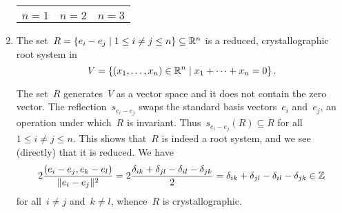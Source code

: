\begin{examples}
\begin{enumerate}
\begin{center}
\begin{tabular}{ccc}
\begin{tikzpicture}
          \end{tikzpicture}
          \\
          $n = 1$
          &
          $n = 2$
          &
          $n = 3$
        \end{tabular}
        \endgroup
      \end{center}
    \item
      The set~$R = \{ e_i - e_j \suchthat 1 \leq i \neq j \leq n\} \subseteq \Real^n$ is a reduced, crystallographic root system in
      \[
        V
        =
        \{
          (x_1, \dotsc, x_n) \in \Real^n
        \suchthat
          x_1 + \dotsb + x_n = 0
        \} \,.
      \]
      
      The set~$R$ generates~$V$ as a vector space and it does not contain the zero vector.
      The reflection~$s_{e_i - e_j}$ swaps the standard basis vectors~$e_i$ and~$e_j$, an operation under which~$R$ is invariant.
      Thus~$s_{e_i - e_j}(R) \subseteq R$ for all~$1 \leq i \neq j \leq n$.
      This shows that~$R$ is indeed a root system, and we see (directly) that it is reduced.
      We have
      \[
        2 \frac{(e_i - e_j, e_k - e_l)}{\lVert e_i - e_j\rVert^2}
        =
        2 \frac{\delta_{ik} + \delta_{jl} - \delta_{il} - \delta_{jk} }{2}
        =
        \delta_{ik} + \delta_{jl} - \delta_{il} - \delta_{jk}
        \in
        \mathbb{Z}
      \]
      for all~$i \neq j$ and~$k \neq l$, whence~$R$ is crystallographic.
      

\end{enumerate}
\end{examples}
